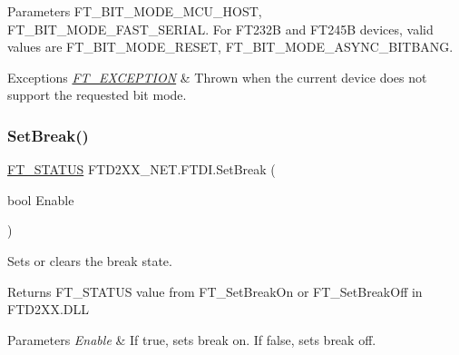 \begin{DoxyParams}{Parameters}
F\+T\+\_\+\+B\+I\+T\+\_\+\+M\+O\+D\+E\+\_\+\+M\+C\+U\+\_\+\+H\+O\+ST, F\+T\+\_\+\+B\+I\+T\+\_\+\+M\+O\+D\+E\+\_\+\+F\+A\+S\+T\+\_\+\+S\+E\+R\+I\+AL. For F\+T232B and F\+T245B devices, valid values are F\+T\+\_\+\+B\+I\+T\+\_\+\+M\+O\+D\+E\+\_\+\+R\+E\+S\+ET, F\+T\+\_\+\+B\+I\+T\+\_\+\+M\+O\+D\+E\+\_\+\+A\+S\+Y\+N\+C\+\_\+\+B\+I\+T\+B\+A\+NG.\\
\hline
\end{DoxyParams}

\begin{DoxyExceptions}{Exceptions}
{\em \mbox{\hyperlink{class_f_t_d2_x_x___n_e_t_1_1_f_t_d_i_1_1_f_t___e_x_c_e_p_t_i_o_n}{F\+T\+\_\+\+E\+X\+C\+E\+P\+T\+I\+ON}}} & Thrown when the current device does not support the requested bit mode.\\
\hline
\end{DoxyExceptions}
\mbox{\label{class_f_t_d2_x_x___n_e_t_1_1_f_t_d_i_a1d2478c43baf448f2ba1919e4f15d96d}} 
\subsubsection{\texorpdfstring{SetBreak()}{SetBreak()}}
{\footnotesize\ttfamily \mbox{\hyperlink{class_f_t_d2_x_x___n_e_t_1_1_f_t_d_i_aabe20ad905cc4ccc1e35dd5b877d9a83}{F\+T\+\_\+\+S\+T\+A\+T\+US}} F\+T\+D2\+X\+X\+\_\+\+N\+E\+T.\+F\+T\+D\+I.\+Set\+Break (\begin{DoxyParamCaption}\item[{bool}]{Enable }\end{DoxyParamCaption})}



Sets or clears the break state. 

\begin{DoxyReturn}{Returns}
F\+T\+\_\+\+S\+T\+A\+T\+US value from F\+T\+\_\+\+Set\+Break\+On or F\+T\+\_\+\+Set\+Break\+Off in F\+T\+D2\+X\+X.\+D\+LL
\end{DoxyReturn}

\begin{DoxyParams}{Parameters}
{\em Enable} & If true, sets break on. If false, sets break off.\\
\hline
\end{DoxyParams}
\mbox{\label{class_f_t_d2_x_x___n_e_t_1_1_f_t_d_i_a28403b9c4db4f77e595144d9eefeb38b}} 
